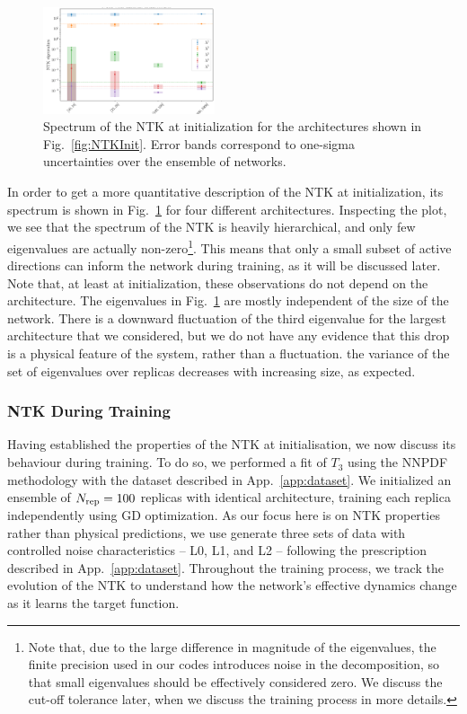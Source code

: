 \begin{figure}[t]
  \centering
  \includegraphics[width=0.45\textwidth]{figs/section_3/ntk_initialization_arch.pdf}
  \caption{Spectrum of the NTK at initialization for the architectures shown in
  Fig.~\ref{fig:NTKInit}. Error bands correspond to one-sigma uncertainties over
  the ensemble of networks.}
  \label{fig:NTKSpectrum}
\end{figure}

In order to get a more quantitative description of the NTK at initialization,
its spectrum is shown in Fig.~\ref{fig:NTKSpectrum} for four different
architectures. Inspecting the plot, we see that the spectrum of the NTK is
heavily hierarchical, and only few eigenvalues are actually
non-zero\footnote{Note that, due to the large difference in magnitude of the
eigenvalues, the finite precision used in our codes introduces noise in the
decomposition, so that small eigenvalues should be effectively considered zero.
We discuss the cut-off tolerance later, when we discuss the training process in
more details.}. This means that only a small subset of active directions can
inform the network during training, as it will be discussed later. Note that, at
least at initialization, these observations do not depend on the architecture.
The eigenvalues in Fig.~\ref{fig:NTKSpectrum} are mostly independent of the size
of the network. There is a downward fluctuation of the third eigenvalue for the
largest architecture that we considered, but we do not have any evidence that
this drop is a physical feature of the system, rather than a fluctuation. the
variance of the set of eigenvalues over replicas decreases with increasing size,
as expected. 


\subsubsection{NTK During Training}
\label{sec:NTKDuringTraining}

Having established the properties of the NTK at initialisation, we now discuss
its behaviour during training. To do so, we performed a fit of $T_3$ using the
NNPDF methodology with the dataset described in App.~\ref{app:dataset}. We
initialized an ensemble of $N_{\rm rep} = 100$ replicas with identical architecture,
training each replica independently using GD optimization. As our focus here is
on NTK properties rather than physical predictions, we use generate three sets
of data with controlled noise characteristics -- L0, L1, and L2 -- following the
prescription described in App.~\ref{app:dataset}. Throughout the training
process, we track the evolution of the NTK to understand how the network's
effective dynamics change as it learns the target function.

